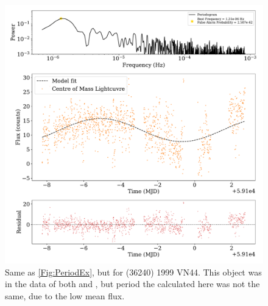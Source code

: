 \documentclass{UCreport}
\begin{document}
\begin{figure}
  \centering
  \includegraphics[width = \textwidth]{Figures/Periodogram1999 VN44Resid.pdf}
  \caption[(36240) 1999 VN44 Periodogram]{Same as \autoref{Fig:PeriodEx}, but for (36240) 1999 VN44.
  This object was in the data of both \citet{Pal2020} and \citet{McNeill2023}, but period the calculated here was not the same, due to the low mean flux.}
  \label{ApFig:1999VN44}
\end{figure}

\newpage
% 

\end{document}

